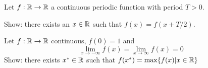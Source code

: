 \documentclass[week=6]{homework}
\begin{document}
\begin{questions}
        \question
        Let $f : \mathbb{R} \to \mathbb{R}$ a continuous periodic function with period $T > 0$. 
        
        Show: there exists an $x \in \mathbb{R}$ such that $f(x) = f(x + T/2)$.
        
        \question
        Let $f : \mathbb{R} \to \mathbb{R}$ continuous, $f(0) = 1$ and 
        \[
	        \lim_{x \to - \infty} f(x) = \lim_{x \to  \infty} f(x) = 0
        \]
        Show: there exists $x^* \in \mathbb{R}$ such that $f(x^*) = \max\{f(x) | x \in \mathbb{R} \}$
     \end{questions}
\end{document}
